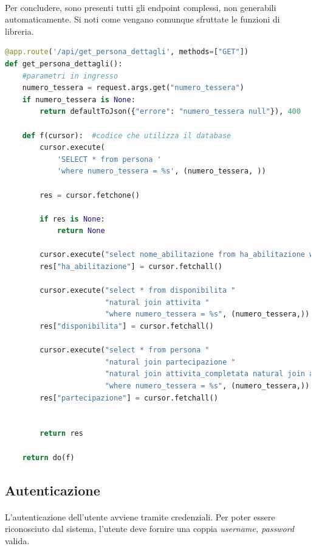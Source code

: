 \documentclass[11pt,a4paper,english]{article}
\begin{document}
\paragraph{} Per concludere, sono presenti tutti gli endpoint complessi, non generabili automaticamente. Si noti come vengano comunque sfruttate le funzioni di libreria.

\begin{lstlisting}[language=python, caption=Esempio di endpoint non generabile]
@app.route('/api/get_persona_dettagli', methods=["GET"])
def get_persona_dettagli():
    #parametri in ingresso
    numero_tessera = request.args.get("numero_tessera")
    if numero_tessera is None:
        return defaultToJson({"errore": "numero_tessera null"}), 400

    def f(cursor):  #codice che utilizza il database
        cursor.execute(
            'SELECT * from persona '
            'where numero_tessera = %s', (numero_tessera, ))

        res = cursor.fetchone()

        if res is None:
            return None

        cursor.execute("select nome_abilitazione from ha_abilitazione where numero_tessera = %s", (numero_tessera, ))
        res["ha_abilitazione"] = cursor.fetchall()

        cursor.execute("select * from disponibilita "
                       "natural join attivita "
                       "where numero_tessera = %s", (numero_tessera,))
        res["disponibilita"] = cursor.fetchall()

        cursor.execute("select * from persona "
                       "natural join partecipazione "
                       "natural join attivita_completata natural join attivita "
                       "where numero_tessera = %s", (numero_tessera,))
        res["partecipazione"] = cursor.fetchall()


        return res

    return do(f)
\end{lstlisting}

\subsection{Autenticazione}

\paragraph{} L'autenticazione dell'utente avviene tramite credenziali. Per poter essere riconosciuto dal sistema, l'utente deve fornire una coppia \emph{username, password} valida. 
\end{document}
